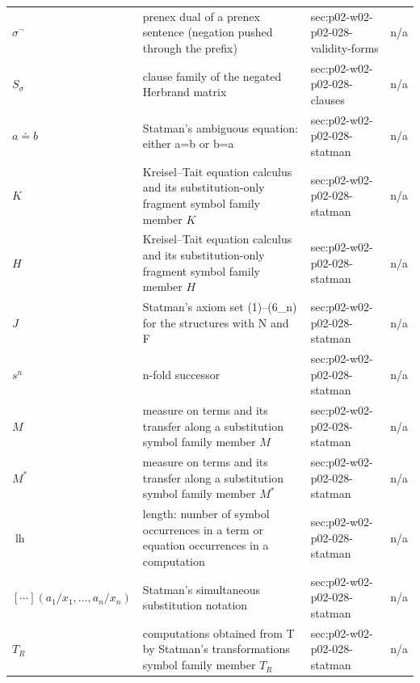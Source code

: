 \begin{longtable}{@{}p{}p{}p{}p{}@{}}
\(\sigma^{\neg}\) & prenex dual of a prenex sentence (negation pushed through the prefix) & sec:\allowbreak{}p02-\allowbreak{}w02-\allowbreak{}p02-\allowbreak{}028-\allowbreak{}validity-\allowbreak{}forms & n/a \\
\(S_\sigma\) & clause family of the negated Herbrand matrix & sec:\allowbreak{}p02-\allowbreak{}w02-\allowbreak{}p02-\allowbreak{}028-\allowbreak{}clauses & n/a \\
\(a\doteq b\) & Statman's ambiguous equation: either a=b or b=a & sec:\allowbreak{}p02-\allowbreak{}w02-\allowbreak{}p02-\allowbreak{}028-\allowbreak{}statman & n/a \\
\(K\) & Kreisel--Tait equation calculus and its substitution-only fragment symbol family member \(K\) & sec:\allowbreak{}p02-\allowbreak{}w02-\allowbreak{}p02-\allowbreak{}028-\allowbreak{}statman & n/a \\
\(H\) & Kreisel--Tait equation calculus and its substitution-only fragment symbol family member \(H\) & sec:\allowbreak{}p02-\allowbreak{}w02-\allowbreak{}p02-\allowbreak{}028-\allowbreak{}statman & n/a \\
\(J\) & Statman's axiom set (1)--(6\_n) for the structures with N and F & sec:\allowbreak{}p02-\allowbreak{}w02-\allowbreak{}p02-\allowbreak{}028-\allowbreak{}statman & n/a \\
\(s^n\) & n-fold successor & sec:\allowbreak{}p02-\allowbreak{}w02-\allowbreak{}p02-\allowbreak{}028-\allowbreak{}statman & n/a \\
\(M\) & measure on terms and its transfer along a substitution symbol family member \(M\) & sec:\allowbreak{}p02-\allowbreak{}w02-\allowbreak{}p02-\allowbreak{}028-\allowbreak{}statman & n/a \\
\(M^*\) & measure on terms and its transfer along a substitution symbol family member \(M^*\) & sec:\allowbreak{}p02-\allowbreak{}w02-\allowbreak{}p02-\allowbreak{}028-\allowbreak{}statman & n/a \\
\(\operatorname{lh}\) & length: number of symbol occurrences in a term or equation occurrences in a computation & sec:\allowbreak{}p02-\allowbreak{}w02-\allowbreak{}p02-\allowbreak{}028-\allowbreak{}statman & n/a \\
\([\cdots](a_1/x_1,\allowbreak \ldots,\allowbreak a_n/x_n)\) & Statman's simultaneous substitution notation & sec:\allowbreak{}p02-\allowbreak{}w02-\allowbreak{}p02-\allowbreak{}028-\allowbreak{}statman & n/a \\
\(T_R\) & computations obtained from T by Statman's transformations symbol family member \(T_R\) & sec:\allowbreak{}p02-\allowbreak{}w02-\allowbreak{}p02-\allowbreak{}028-\allowbreak{}statman & n/a \\

\end{longtable}
